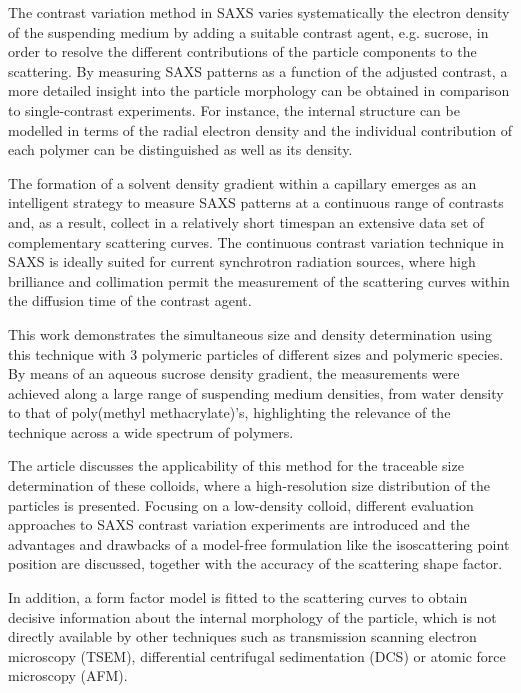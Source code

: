 The contrast variation method in SAXS varies systematically the electron density of the suspending medium by adding a suitable contrast agent, e.g. sucrose, in order to resolve the different contributions of the particle components to the scattering. By measuring SAXS patterns as a function of the adjusted contrast, a more detailed insight into the particle morphology can be obtained in comparison to single-contrast experiments\citep{bolze_situ_2004}. For instance, the internal structure can be modelled in terms of the radial electron density\citep{dingenouts_radial_1994,dingenouts_analysis_1999,ballauff_analysis_2011,ballauff_small-angle_1996} and the individual contribution of each polymer can be distinguished\citep{beyer_saxs_1990,grunder_analysis_1991,grunder_small-angle_1993,ottewill_characterization_1995,bolze_small-angle_1997,dingenouts_structure_1994} as well as its density\citep{mykhaylyk_application_2007}.

The formation of a solvent density gradient within a capillary emerges as an intelligent strategy to measure SAXS patterns at a continuous range of contrasts and, as a result, collect in a relatively short timespan an extensive data set of complementary scattering curves\citep{garcia-diez_nanoparticle_2015}. The continuous contrast variation technique in SAXS is ideally suited for current synchrotron radiation sources, where high brilliance and collimation permit the measurement of the scattering curves within the diffusion time of the contrast agent.

This work demonstrates the simultaneous size and density determination using this technique with 3 polymeric particles of different sizes and polymeric species. By means of an aqueous sucrose density gradient, the measurements were achieved along a large range of suspending medium densities, from water density to that of poly(methyl methacrylate)'s, highlighting the relevance of the technique across a wide spectrum of polymers.

The article discusses the applicability of this method for the traceable size determination of these colloids, where a high-resolution size distribution of the particles is presented. Focusing on a low-density colloid, different evaluation approaches to SAXS contrast variation experiments are introduced and the advantages and drawbacks of a model-free formulation like the isoscattering point position are discussed, together with the accuracy of the scattering shape factor.

In addition, a form factor model is fitted to the scattering curves to obtain decisive information about the internal morphology of the particle, which is not directly available by other techniques such as transmission scanning electron microscopy (TSEM), differential centrifugal sedimentation (DCS)\citep{fielding_correcting_2012} or atomic force microscopy (AFM). 

